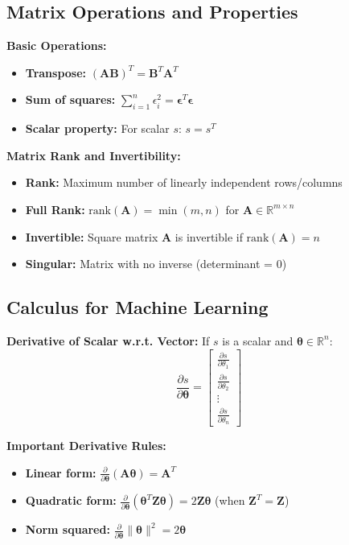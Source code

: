 \documentclass{article}
\providecommand{\vtheta}{\boldsymbol{\theta}}
\providecommand{\mZ}{\mathbf{Z}}
\providecommand{\mA}{\mathbf{A}}
\providecommand{\mB}{\mathbf{B}}
\providecommand{\Real}{\mathbb{R}}
\begin{document}
\subsection{Matrix Operations and Properties}
\textbf{Basic Operations:}
\begin{itemize}
	\item \textbf{Transpose:} $(\mA\mB)^T = \mB^T\mA^T$
	\item \textbf{Sum of squares:} $\sum_{i=1}^n \epsilon_i^2 = \boldsymbol{\epsilon}^T\boldsymbol{\epsilon}$
	\item \textbf{Scalar property:} For scalar $s$: $s = s^T$
\end{itemize}

\textbf{Matrix Rank and Invertibility:}
\begin{itemize}
	\item \textbf{Rank:} Maximum number of linearly independent rows/columns
	\item \textbf{Full Rank:} $\text{rank}(\mA) = \min(m,n)$ for $\mA \in \Real^{m \times n}$
	\item \textbf{Invertible:} Square matrix $\mA$ is invertible if $\text{rank}(\mA) = n$
	\item \textbf{Singular:} Matrix with no inverse (determinant = 0)
\end{itemize}

\subsection{Calculus for Machine Learning}
\textbf{Derivative of Scalar w.r.t. Vector:}
If $s$ is a scalar and $\vtheta \in \Real^n$:
$$\frac{\partial s}{\partial \vtheta} = \begin{bmatrix} \frac{\partial s}{\partial \theta_1} \\ \frac{\partial s}{\partial \theta_2} \\ \vdots \\ \frac{\partial s}{\partial \theta_n} \end{bmatrix}$$

\textbf{Important Derivative Rules:}
\begin{itemize}
	\item \textbf{Linear form:} $\frac{\partial}{\partial \vtheta}(\mA\vtheta) = \mA^T$
	\item \textbf{Quadratic form:} $\frac{\partial}{\partial \vtheta}(\vtheta^T\mZ\vtheta) = 2\mZ\vtheta$ (when $\mZ^T = \mZ$)
	\item \textbf{Norm squared:} $\frac{\partial}{\partial \vtheta}\|\vtheta\|^2 = 2\vtheta$
\end{itemize}
\end{document}
